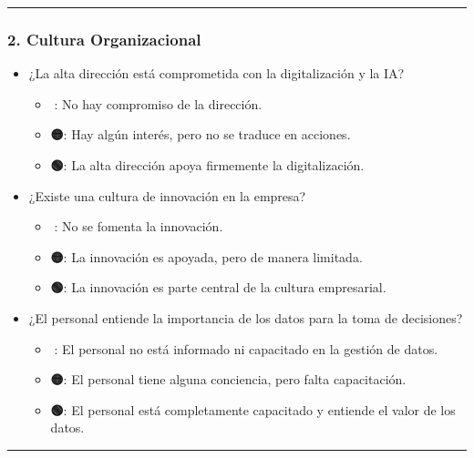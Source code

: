 \documentclass[
  10pt,
  letterpaper,
]{book}
\providecommand{\tightlist}{%
  \setlength{\itemsep}{0pt}\setlength{\parskip}{0pt}}\usepackage{longtable,booktabs,array}
\begin{document}
\begin{center}\rule{0.5\linewidth}{0.5pt}\end{center}

\subsubsection{\texorpdfstring{\textbf{2. Cultura
Organizacional}}{2. Cultura Organizacional}}\label{cultura-organizacional}

\begin{itemize}
\tightlist
\item
  ¿La alta dirección está comprometida con la digitalización y la IA?

  \begin{itemize}
  \tightlist
  \item
    \textbf{🔴}: No hay compromiso de la dirección.
  \item
    \textbf{🟡}: Hay algún interés, pero no se traduce en acciones.
  \item
    \textbf{🟢}: La alta dirección apoya firmemente la digitalización.
  \end{itemize}
\item
  ¿Existe una cultura de innovación en la empresa?

  \begin{itemize}
  \tightlist
  \item
    \textbf{🔴}: No se fomenta la innovación.
  \item
    \textbf{🟡}: La innovación es apoyada, pero de manera limitada.
  \item
    \textbf{🟢}: La innovación es parte central de la cultura
    empresarial.
  \end{itemize}
\item
  ¿El personal entiende la importancia de los datos para la toma de
  decisiones?

  \begin{itemize}
  \tightlist
  \item
    \textbf{🔴}: El personal no está informado ni capacitado en la
    gestión de datos.
  \item
    \textbf{🟡}: El personal tiene alguna conciencia, pero falta
    capacitación.
  \item
    \textbf{🟢}: El personal está completamente capacitado y entiende el
    valor de los datos.
  \end{itemize}
\end{itemize}

\begin{center}\rule{0.5\linewidth}{0.5pt}\end{center}
\end{document}
